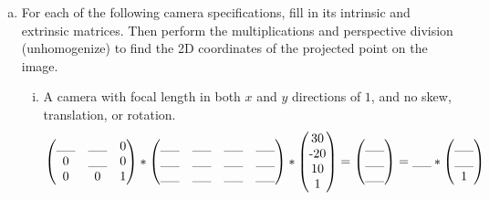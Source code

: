 \begin{enumerate} [(a)]
\item For each of the following camera specifications, fill in its intrinsic and extrinsic matrices. Then perform the multiplications and perspective division (unhomogenize) to find the 2D coordinates of the projected point on the image.
\begin{enumerate} [(i)]

\item A camera with focal length in both $x$ and $y$ directions of $1$, and no skew, translation, or rotation.
\vspace{-0.3cm}
\begin{align}
    \begin{pmatrix} 
    \_\_ & \_\_ & $0$ \\ 
    $0$ & \_\_ & $0$ \\ 
    $0$ & $0$ & $1$ \end{pmatrix} *
    \begin{pmatrix} 
    \_\_ & \_\_ & \_\_ & \_\_ \\ 
    \_\_ & \_\_ & \_\_ & \_\_ \\ 
    \_\_ & \_\_ & \_\_ & \_\_ \end{pmatrix} * 
    \begin{pmatrix} 
    $30$ \\ 
    $-20$ \\ 
    $10$ \\ 
    $1$ \end{pmatrix}
    = \begin{pmatrix}  \_\_ \\ \_\_ \\ \_\_ \end{pmatrix}
    = \_\_ * \begin{pmatrix}  \_\_ \\ \_\_ \\ $1$ \end{pmatrix}
\end{align}


\end{enumerate}
\end{enumerate}
